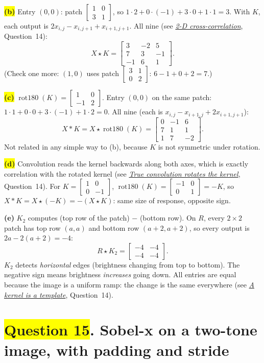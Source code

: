 \documentclass[12pt,a4paper]{article}
\newcommand{\seeconcept}[3]{(see \hyperref[#1]{\textit{#2}}, Question~#3)}
\newcommand{\rot}{\operatorname{rot180}}
\newcommand{\hlq}[1]{{\setlength{\fboxsep}{1.5pt}\colorbox{yellow}{#1}}}
\begin{document}
\hlq{\textbf{(b)}} Entry $(0,0)$: patch $\begin{bmatrix}1&0\\3&1\end{bmatrix}$, so $1\cdot2+0\cdot(-1)+3\cdot0+1\cdot1=3$. With $K$, each output is $2x_{i,j}-x_{i,j+1}+x_{i+1,j+1}$. All nine \seeconcept{c:corr2d}{2-D cross-correlation}{14}:
\[
X\star K=\begin{bmatrix}3&-2&5\\7&3&-1\\-1&6&1\end{bmatrix}.
\]
(Check one more: $(1,0)$ uses patch $\begin{bmatrix}3&1\\0&2\end{bmatrix}$: $6-1+0+2=7$.)

\hlq{\textbf{(c)}} $\rot(K)=\begin{bmatrix}1&0\\-1&2\end{bmatrix}$. Entry $(0,0)$ on the same patch: $1\cdot1+0\cdot0+3\cdot(-1)+1\cdot2=0$. All nine (each is $x_{i,j}-x_{i+1,j}+2x_{i+1,j+1}$):
\[
X*K=X\star\rot(K)=\begin{bmatrix}0&-1&6\\7&1&1\\1&7&-2\end{bmatrix}.
\]
Not related in any simple way to (b), because $K$ is not symmetric under rotation.

\hlq{\textbf{(d)}} Convolution reads the kernel backwards along both axes, which is exactly correlation with the rotated kernel \seeconcept{c:rot180}{True convolution rotates the kernel}{14}. For $K=\begin{bmatrix}1&0\\0&-1\end{bmatrix}$, $\rot(K)=\begin{bmatrix}-1&0\\0&1\end{bmatrix}=-K$, so $X*K=X\star(-K)=-(X\star K)$: same size of response, opposite sign.

\textbf{(e)} $K_2$ computes (top row of the patch) $-$ (bottom row). On $R$, every $2\times2$ patch has top row $(a,a)$ and bottom row $(a+2,a+2)$, so every output is $2a-2(a+2)=-4$:
\[
R\star K_2=\begin{bmatrix}-4&-4\\-4&-4\end{bmatrix}.
\]
$K_2$ detects \emph{horizontal} edges (brightness changing from top to bottom). The negative sign means brightness \emph{increases} going down. All entries are equal because the image is a uniform ramp: the change is the same everywhere \seeconcept{c:template}{A kernel is a template}{14}.
\section[Question 15. Sobel-x on a two-tone image, with padding and stride]{\hlq{Question 15}. Sobel-x on a two-tone image, with padding and stride}
\end{document}

